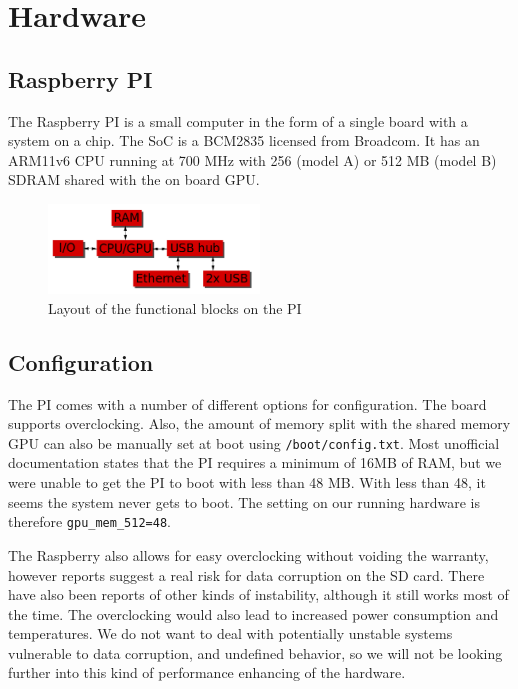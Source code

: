 \clearpage
\section{Hardware}
\label{sec:hardware}

\subsection{Raspberry PI}
The Raspberry PI is a small computer in the form of a single board with a system on a chip. The SoC is a BCM2835 licensed from Broadcom. It has an ARM11v6 CPU running at 700 MHz with 256 (model A) or 512 MB (model B) SDRAM shared with the on board GPU.
\begin{figure}[h]
	\centering
    \includegraphics[width=0.5\textwidth]{hardware/raspberrypi_block_function}
    \caption{Layout of the functional blocks on the PI}
    \label{fig:pi_blockdiagram}
\end{figure}

\subsection{Configuration}
The PI comes with a number of different options for configuration. The board supports overclocking. Also, the amount of memory split with the shared memory GPU can also be manually set at boot using {\tt /boot/config.txt}.
Most unofficial documentation states that the PI requires a minimum of 16MB of RAM, but we were unable to get the PI to boot with less than 48 MB. 
With less than 48, it seems the system never gets to boot.
The setting on our running hardware is therefore {\tt gpu\_mem\_512=48}.

The Raspberry also allows for easy overclocking without voiding the warranty, however reports suggest a real risk for data corruption on the SD card. There have also been reports of other kinds of instability, although it still works most of the time.
The overclocking would also lead to increased power consumption and temperatures.
We do not want to deal with potentially unstable systems vulnerable to data corruption, and undefined behavior, so we will not be looking further into this kind of performance enhancing of the hardware.

